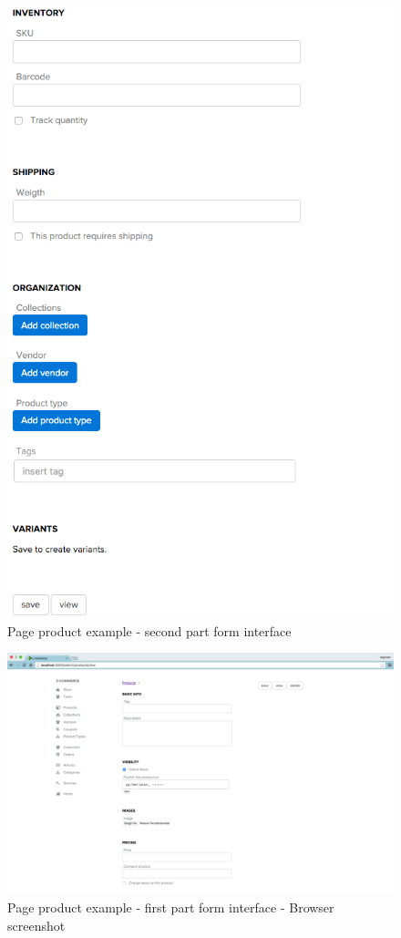 \begin{figure}[htb]
\centering
\includegraphics[width=1.0\linewidth]{images/chapter3/products-example1.png}\hfill
\caption[page product second part form]{Page product example - second part form interface}
\label{fig:design_page}
\end{figure}
\begin{figure}[htb]
\centering
\includegraphics[width=1.0\linewidth]{images/chapter3/prod-part1-all.png}\hfill
\caption[page product first part form browser]{Page product example - first part form interface - Browser screenshot}
\label{fig:design_page}
\end{figure}
